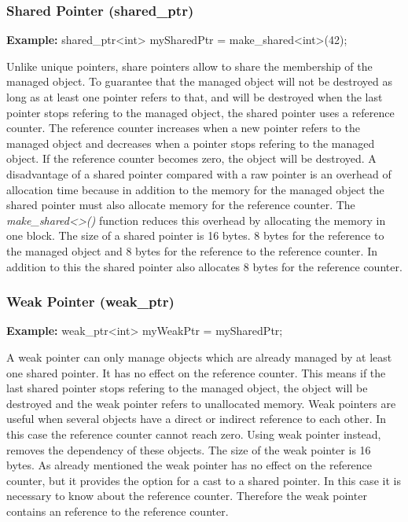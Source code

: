 { %
\subsubsection{Shared Pointer (shared\_ptr)}\label{sec:sharedPointer}
\begin{center}\textbf{Example:} shared\_ptr<int> mySharedPtr = make\_shared<int>(42);\end{center}
Unlike unique pointers, share pointers allow to share the membership of the managed object. To guarantee that the managed object will not be destroyed as long as at least one pointer refers to that, and will be destroyed when the last pointer stops refering to the managed object, the shared pointer uses a reference counter. The reference counter increases when a new pointer refers to the managed object and decreases when a pointer stops refering to the managed object. If the reference counter becomes zero, the object will be destroyed. A disadvantage of a shared pointer compared with a raw pointer is an overhead of allocation time because in addition to the memory for the managed object the shared pointer must also allocate memory for the reference counter. The \emph{make\_shared<>()} function reduces this overhead by allocating the memory in one block. \cite[cf.][854 - 861]{Kirch2015} The size of a shared pointer is 16 bytes. 8 bytes for the reference to the managed object and 8 bytes for the reference to the reference counter. In addition to this the shared pointer also allocates 8 bytes for the reference counter.

\subsubsection{Weak Pointer (weak\_ptr)}\label{sec:weakPointer}
\begin{center}\textbf{Example:} weak\_ptr<int> myWeakPtr = mySharedPtr;\end{center}
A weak pointer can only manage objects which are already managed by at least one shared pointer. It has no effect on the reference counter. This means if the last shared pointer stops refering to the managed object, the object will be destroyed and the weak pointer refers to unallocated memory. Weak pointers are useful when several objects have a direct or indirect reference to each other. In this case the reference counter cannot reach zero. Using weak pointer instead, removes the dependency of these objects. \cite[cf.][862 - 863]{Kirch2015} The size of the weak pointer is 16 bytes. As already mentioned the weak pointer has no effect on the reference counter, but it provides the option for a cast to a shared pointer. In this case it is necessary to know about the reference counter. Therefore the weak pointer contains an reference to the reference counter.

}
